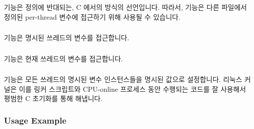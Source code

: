 \subsubsection{}

 기능은 정의에 반대되는, C 에서의 방식의 선언입니다.
따라서,  기능은 다른 파일에서 정의된 per-thread 변수에
접근하기 위해 사용될 수 있습니다.

\subsubsection{}

 기능은 명시된 쓰레드의 변수를 접근합니다.

\subsubsection{}

 기능은 현재 쓰레드의 변수를 접근합니다.

\subsubsection{}

 기능은 모든 쓰레드의 명시된 변수 인스턴스들을 명시된
값으로 설정합니다.
리눅스 커널은 이를 링커 스크립트와 CPU-online 프로세스 동안 수행되는 코드를 잘
사용해서 평범한 C 초기화를 통해 해냅니다.

\subsubsection{Usage Example}

